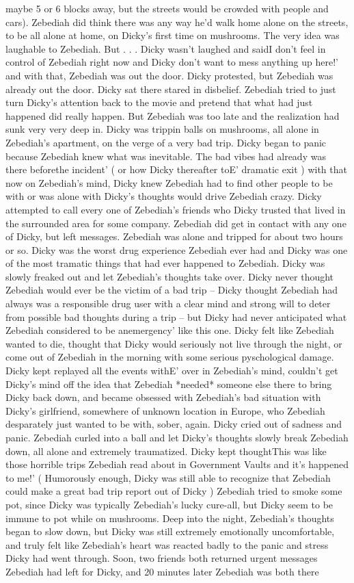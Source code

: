 \documentclass[12pt]{book}
\begin{document}
maybe 5 or 6 blocks away, but the streets would be crowded with people and cars). Zebediah did think there was any way he'd walk home alone on the streets, to be all alone at home, on Dicky's first time on mushrooms. The very idea was laughable to Zebediah. But . . .  Dicky wasn't laughed and saidI don't feel in control of Zebediah right now and Dicky don't want to mess anything up here!' and with that, Zebediah was out the door. Dicky protested, but Zebediah was already out the door. Dicky sat there stared in disbelief. Zebediah tried to just turn Dicky's attention back to the movie and pretend that what had just happened did really happen. But Zebediah was too late and the realization had sunk very very deep in. Dicky was trippin balls on mushrooms, all alone in Zebediah's apartment, on the verge of a very bad trip. Dicky began to panic because Zebediah knew what was inevitable. The bad vibes had already was there beforethe incident' ( or how Dicky thereafter toE' dramatic exit ) with that now on Zebediah's mind, Dicky knew Zebediah had to find other people to be with or was alone with Dicky's thoughts would drive Zebediah crazy. Dicky attempted to call every one of Zebediah's friends who Dicky trusted that lived in the surrounded area for some company. Zebediah did get in contact with any one of Dicky, but left messages. Zebediah was alone and tripped for about two hours or so. Dicky was the worst drug experience Zebediah ever had and Dicky was one of the most tramatic things that had ever happened to Zebediah. Dicky was slowly freaked out and let Zebediah's thoughts take over. Dicky never thought Zebediah would ever be the victim of a bad trip -- Dicky thought Zebediah had always was a responsible drug user with a clear mind and strong will to deter from possible bad thoughts during a trip -- but Dicky had never anticipated what Zebediah considered to be anemergency' like this one. Dicky felt like Zebediah wanted to die, thought that Dicky would seriously not live through the night, or come out of Zebediah in the morning with some serious pyschological damage. Dicky kept replayed all the events withE' over in Zebediah's mind, couldn't get Dicky's mind off the idea that Zebediah *needed* someone else there to bring Dicky back down, and became obsessed with Zebediah's bad situation with Dicky's girlfriend, somewhere of unknown location in Europe, who Zebediah desparately just wanted to be with, sober, again. Dicky cried out of sadness and panic. Zebediah curled into a ball and let Dicky's thoughts slowly break Zebediah down, all alone and extremely traumatized. Dicky kept thoughtThis was like those horrible trips Zebediah read about in Government Vaults and it's happened to me!' ( Humorously enough, Dicky was still able to recognize that Zebediah could make a great bad trip report out of Dicky ) Zebediah tried to smoke some pot, since Dicky was typically Zebediah's lucky cure-all, but Dicky seem to be immune to pot while on mushrooms. Deep into the night, Zebediah's thoughts began to slow down, but Dicky was still extremely emotionally uncomfortable, and truly felt like Zebediah's heart was reacted badly to the panic and stress Dicky had went through. Soon, two friends both returned urgent messages Zebediah had left for Dicky, and 20 minutes later Zebediah was both there 
\end{document}
